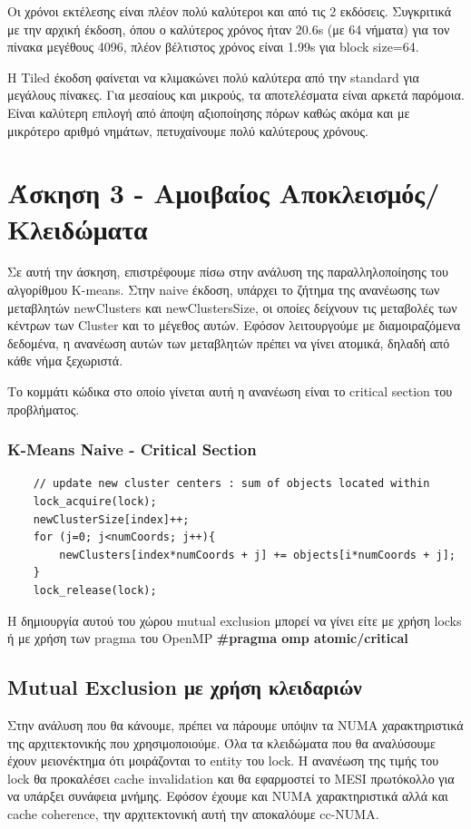 \documentclass[letterpaper,12pt]{article}
\begin{document}
Οι χρόνοι εκτέλεσης είναι πλέον πολύ καλύτεροι και από τις 2 εκδόσεις. Συγκριτικά με την αρχική έκδοση,
όπου ο καλύτερος χρόνος ήταν 20.6s (με 64 νήματα) για τον πίνακα μεγέθους 4096, πλέον βέλτιστος χρόνος
είναι 1.99s για block size=64. 

Η Tiled έκοδση φαίνεται να κλιμακώνει πολύ καλύτερα από την standard για μεγάλους πίνακες. Για μεσαίους
και μικρούς, τα αποτελέσματα είναι αρκετά παρόμοια. Είναι καλύτερη επιλογή από άποψη αξιοποίησης πόρων
καθώς ακόμα και με μικρότερο αριθμό νημάτων, πετυχαίνουμε πολύ καλύτερους χρόνους.

\section{Άσκηση 3 - Αμοιβαίος Αποκλεισμός/Κλειδώματα}

Σε αυτή την άσκηση, επιστρέφουμε πίσω στην ανάλυση της παραλληλοποίησης του αλγορίθμου K-means. Στην naive 
έκδοση, υπάρχει το ζήτημα της ανανέωσης των μεταβλητών newClusters και newClustersSize, οι οποίες δείχνουν
τις μεταβολές των κέντρων των Cluster και το μέγεθος αυτών. Εφόσον λειτουργούμε με διαμοιραζόμενα δεδομένα,
η ανανέωση αυτών των μεταβλητών πρέπει να γίνει ατομικά, δηλαδή από κάθε νήμα ξεχωριστά.

Το κομμάτι κώδικα στο οποίο γίνεται αυτή η ανανέωση είναι το critical section του προβλήματος.

\subsubsection*{K-Means Naive - Critical Section}
\begin{lstlisting}
    // update new cluster centers : sum of objects located within 
    lock_acquire(lock);
    newClusterSize[index]++;
    for (j=0; j<numCoords; j++){
        newClusters[index*numCoords + j] += objects[i*numCoords + j];
    }
    lock_release(lock);
\end{lstlisting}

Η δημιουργία αυτού του χώρου mutual exclusion μπορεί να γίνει είτε με χρήση locks ή με χρήση
των pragma του OpenMP \textbf{\#pragma omp atomic/critical}

\subsection{Mutual Exclusion με χρήση κλειδαριών}

Στην ανάλυση που θα κάνουμε, πρέπει να πάρουμε υπόψιν τα NUMA χαρακτηριστικά της 
αρχιτεκτονικής που χρησιμοποιούμε. Όλα τα κλειδώματα που θα αναλύσουμε έχουν μειονέκτημα
ότι μοιράζονται το entity του lock. Η ανανέωση της τιμής του lock θα προκαλέσει cache invalidation
και θα εφαρμοστεί το MESI πρωτόκολλο για να υπάρξει συνάφεια μνήμης. Εφόσον έχουμε και NUMA χαρακτηριστικά
αλλά και cache coherence, την αρχιτεκτονική αυτή την αποκαλόυμε cc-NUMA.
\end{document}
